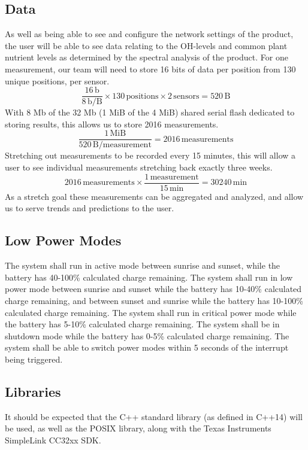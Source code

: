 \subsection{Data} As well as being able to see and configure the network settings of the product, the user will be able to see data relating to the OH-levels and common plant nutrient levels as determined by the spectral analysis of the product. For one measurement, our team will need to store 16 bits of data per position from 130 unique positions, per sensor.
\begin{equation}
    \frac{16\,\mathrm{b}}{8\,\mathrm{b/B}}\times 130\,\mathrm{positions} \times 2\,\mathrm{sensors} = 520\,\mathrm{B}
\end{equation}
With 8 Mb of the 32 Mb (1 MiB of the 4 MiB) shared serial flash dedicated to storing results, this allows us to store 2016 measurements.
\begin{equation}
    \frac{1\,\mathrm{MiB}}{520\,\mathrm{B/measurement}} = 2016\,\mathrm{measurements}
\end{equation}
Stretching out measurements to be recorded every 15 minutes, this will allow a user to see individual measurements stretching back exactly three weeks.
\begin{equation}
    2016\,\mathrm{measurements} \times \frac{1\,\mathrm{measurement}}{15\,\mathrm{min}} = 30240\,\mathrm{min} 
\end{equation}
As a stretch goal these measurements can be aggregated and analyzed, and allow us to serve trends and predictions to the user.

\subsection{Low Power Modes} The system shall run in active mode between sunrise and sunset, while the battery has 40-100\% calculated charge remaining. The system shall run in low power mode between sunrise and sunset while the battery has 10-40\% calculated charge remaining, and between sunset and sunrise while the battery has 10-100\% calculated charge remaining. The system shall run in critical power mode while the battery has 5-10\% calculated charge remaining. The system shall be in shutdown mode while the battery has 0-5\% calculated charge remaining. The system shall be able to switch power modes within 5 seconds of the interrupt being triggered.

\subsection{Libraries}
It should be expected that the C++ standard library (as defined in C++14) will be used, as well as the POSIX library, along with the Texas Instruments SimpleLink CC32xx SDK.

